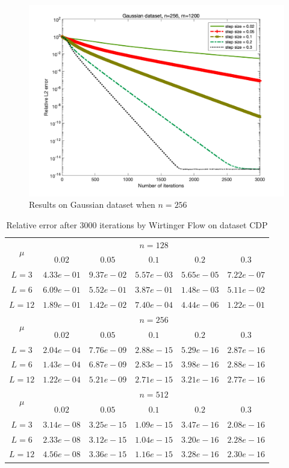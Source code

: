 \documentclass{article}
\begin{document}
\begin{figure}
\begin{minipage}{0.33\linewidth}
			\includegraphics[width=1\linewidth]{./fig/gaussian+33.png}
			\caption{$m=1200$}
		\end{minipage}
		\caption*{Results on Gaussian dataset when $n=256$}
	\end{figure}
	\begin{table}
		\centering
		\begin{tabular}{|c|c|c|c|c|c|}
		\hline
		\multirow{2}{*}{ $\mu$} &\multicolumn{5}{c|}{$n = 128 $}\\\cline{2-6}
		 &$0.02$ &$0.05$ &$0.1$ &$0.2$ &$0.3$\\\hline
		$L=3$ & $4.33e-01$ & $9.37e-02$ & $5.57e-03$ & $5.65e-05$ & $7.22e-07$\\\hline
		$L=6$ & $6.09e-01$ & $5.52e-01$ & $3.87e-01$ & $1.48e-03$ & $5.11e-02$\\\hline
		$L=12$ & $1.89e-01$ & $1.42e-02$ & $7.40e-04$ & $4.44e-06$ & $1.22e-01$\\\hline
		\multirow{2}{*}{ $\mu$} &\multicolumn{5}{c|}{$n = 256 $}\\\cline{2-6}
 &$0.02$ &$0.05$ &$0.1$ &$0.2$ &$0.3$\\\hline
$L=3$ & $2.04e-04$ & $7.76e-09$ & $2.88e-15$ & $5.29e-16$ & $2.87e-16$\\\hline
$L=6$ & $1.43e-04$ & $6.87e-09$ & $2.83e-15$ & $3.98e-16$ & $2.88e-16$\\\hline
$L=12$ & $1.22e-04$ & $5.21e-09$ & $2.71e-15$ & $3.21e-16$ & $2.77e-16$\\\hline
\multirow{2}{*}{ $\mu$} &\multicolumn{5}{c|}{$n = 512 $}\\\cline{2-6}
 &$0.02$ &$0.05$ &$0.1$ &$0.2$ &$0.3$\\\hline
$L=3$ & $3.14e-08$ & $3.25e-15$ & $1.09e-15$ & $3.47e-16$ & $2.08e-16$\\\hline
$L=6$ & $2.33e-08$ & $3.12e-15$ & $1.04e-15$ & $3.20e-16$ & $2.28e-16$\\\hline
$L=12$ & $4.56e-08$ & $3.36e-15$ & $1.16e-15$ & $3.28e-16$ & $2.30e-16$\\\hline
		\end{tabular}
		\caption{Relative error after $3000$ iterations by Wirtinger Flow on dataset CDP\label{CDP}}
		\end{table}
\end{document}
